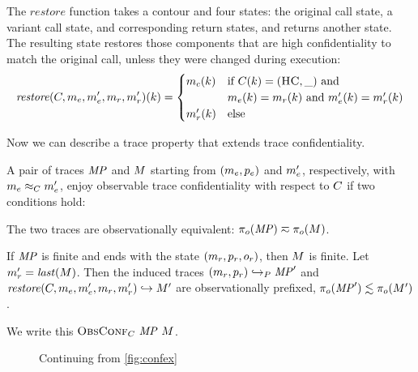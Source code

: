 \documentclass[acmsmall,review,anonymous]{acmart}\settopmatter{printfolios=true,printccs=false,printacmref=false}
\begin{document}
      The \(\mathit{restore}\) function takes a contour and four states: the
      original call state, a variant call state, and corresponding return
      states, and returns another state. The resulting state restores those
      components that are high confidentiality to match the original call,
      unless they were changed during execution:
      \[\mathit{restore}(C,m_e,m_e',m_r,m_r')
        (k) =
        \begin{cases}
          m_c(k) & \text{if } C(k) = (\textsc{HC},\_)
            \text{ and } \\
          & m_e(k) = m_r(k) \text{ and }
            m_e'(k) = m_r'(k) \\
          m_r'(k) & \text{else} \\
        \end{cases}\]

      Now we can describe a trace property that extends trace confidentiality.


      A pair of traces \(\mathit{MP}\) and \(M\) starting from
      \((m_e,p_e)\) and \(m_e'\), respectively, with
      \(m_e \approx_C m_e'\), enjoy observable trace
      confidentiality with respect to \(C\) if two conditions hold:

      The two traces are observationally equivalent: \(\pi_o(\mathit{MP}) \eqsim
      \pi_o(M)\).

      If \(\mathit{MP}\) is finite and ends with the state
      \((m_r,p_r,o_r)\), then \(M\) is finite. Let
      \(m_r' = \mathit{last}(M)\). Then the induced traces
      \((m_r,p_r) \hookrightarrow_P \mathit{MP}'\) and
      \(\mathit{restore}(C,m_e,m_e',m_r,m_r')
      \hookrightarrow M'\) are observationally prefixed,
      \(\pi_o(\mathit{MP}') \lesssim \pi_o(M')\).

      We write this \(\text{\sc ObsConf}_C ~ \mathit{MP} ~ M\).

      \begin{figure}
        \confidentialitylazyexample
        \caption{Continuing from \cref{fig:confex}}
        \label{fig:conflex}
      \end{figure}
\end{document}
